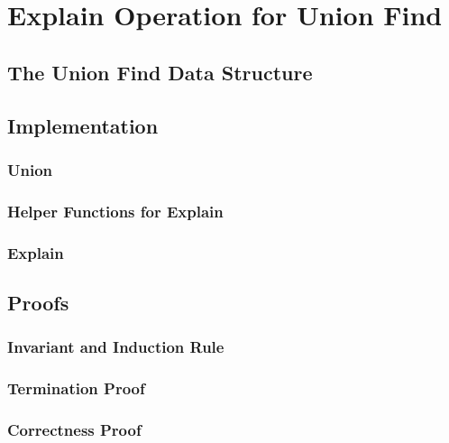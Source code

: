 
\chapter{Explain Operation for Union Find}\label{chapter:union_find}

\section{The Union Find Data Structure}

\section{Implementation}

\subsection{Union}

\subsection{Helper Functions for Explain}

\subsection{Explain}

\section{Proofs}

\subsection{Invariant and Induction Rule}

\subsection{Termination Proof}

\subsection{Correctness Proof}
